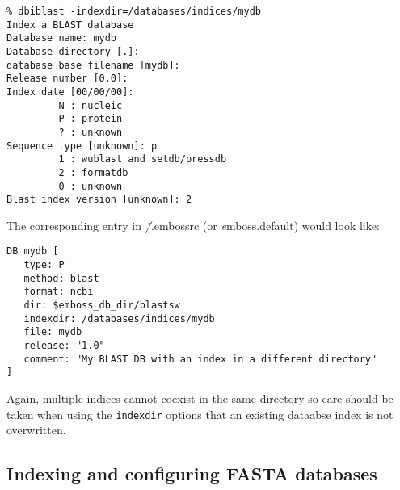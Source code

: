 \documentclass{report}
\newcommand{\ilcomm}[1]{{\tt #1}}
\newcommand{\filename}[1]{{\sf\textsl #1}}
\newcommand{\progname}[1]{{\sc #1}}
\begin{document}
\begin{verbatim}
% dbiblast -indexdir=/databases/indices/mydb
Index a BLAST database
Database name: mydb
Database directory [.]: 
database base filename [mydb]: 
Release number [0.0]: 
Index date [00/00/00]: 
         N : nucleic
         P : protein
         ? : unknown
Sequence type [unknown]: p
         1 : wublast and setdb/pressdb
         2 : formatdb
         0 : unknown
Blast index version [unknown]: 2

\end{verbatim}

The corresponding entry in \filename{\~/.embossrc} (or \filename{emboss.default}) would look like:


\begin{verbatim}
DB mydb [
   type: P
   method: blast
   format: ncbi
   dir: $emboss_db_dir/blastsw
   indexdir: /databases/indices/mydb
   file: mydb
   release: "1.0"
   comment: "My BLAST DB with an index in a different directory"
]
\end{verbatim}

Again, multiple indices cannot coexist in the same directory so care should be taken when using the \ilcomm{indexdir} options that an existing dataabse index is not overwritten.

\begin{comment}
\subsubsection{FASTA formats used with \progname{dbiblast}}
\label{subsec:fasta}
The following FASTA formats are recognised by \progname{dbiblast}:

\begin{tabular}[t]{|l|l|}\hline \setlength{\baselineskip}{1.2\baselineskip}
GENBANK/NCBI & \ilcomm{> \ldots |accno|id \ldots }\\
\hline
GCG & \ilcomm{>{\sl dbname}:accno id \ldots }\\
\hline
SIMPLE &\ilcomm{ >accno id \ldots} \\
\hline
ID & \ilcomm{>id}\\
\hline
\end{tabular}
\ilcomm{...} refers to any text. Note that the ID must be the only item in the header for the ID format.\footnote{Recent changes to \progname{dbifasta} may propogate through to \progname{dbiblast} allowing for the indexing of a wider variety of formats than at present (version 1.1.0)}
\end{comment}
\subsection{Indexing and configuring FASTA databases}
\end{document}
